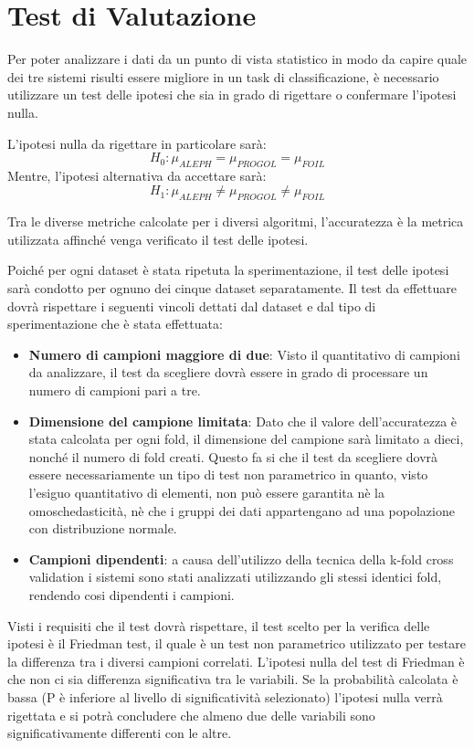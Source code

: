 \section{Test di Valutazione}
Per poter analizzare i dati da un punto di vista statistico in modo da capire quale dei tre sistemi risulti essere migliore in un task di classificazione, è necessario utilizzare un test delle ipotesi che sia in grado di rigettare o confermare l'ipotesi nulla.

L'ipotesi nulla da rigettare in particolare sarà:
$$H_0 : \mu_{ALEPH} = \mu_{PROGOL} = \mu_{FOIL} $$
Mentre, l'ipotesi alternativa da accettare sarà:
$$H_1 : \mu_{ALEPH} \neq \mu_{PROGOL} \neq \mu_{FOIL} $$

Tra le diverse metriche calcolate per i diversi algoritmi, l'accuratezza è la metrica utilizzata affinché venga verificato il test delle ipotesi.

Poiché per ogni dataset è stata ripetuta la sperimentazione, il test delle ipotesi sarà condotto per ognuno dei cinque dataset separatamente.
Il test da effettuare dovrà rispettare i seguenti vincoli dettati dal dataset e dal tipo di sperimentazione che è stata effettuata:
\begin{itemize}
	\item \textbf{Numero di campioni maggiore di due}: Visto il quantitativo di campioni da analizzare, il test da scegliere dovrà essere in grado di processare un numero di campioni pari a tre.
	\item \textbf{Dimensione del campione limitata}: Dato che il valore dell'accuratezza è stata calcolata per ogni fold, il dimensione del campione sarà limitato a dieci, nonché il numero di fold creati. Questo fa si che il test da scegliere dovrà essere necessariamente un tipo di test non parametrico in quanto, visto l'esiguo quantitativo di elementi, non può essere garantita nè la omoschedasticità, nè che i gruppi dei dati appartengano ad una popolazione con distribuzione normale.
	\item \textbf{Campioni dipendenti}: a causa dell'utilizzo della tecnica della k-fold cross validation i sistemi sono stati analizzati utilizzando gli stessi identici fold, rendendo cosi dipendenti i campioni.
\end{itemize}

Visti i requisiti che il test dovrà rispettare, il test scelto per la verifica delle ipotesi è il Friedman test, il quale è un test non parametrico utilizzato per testare la differenza tra i diversi campioni correlati.
L'ipotesi nulla del test di Friedman è che non ci sia differenza significativa tra le variabili. Se la probabilità calcolata è bassa (P è inferiore al livello di significatività selezionato) l'ipotesi nulla verrà rigettata e si potrà concludere che almeno due delle variabili sono significativamente differenti con le altre.

